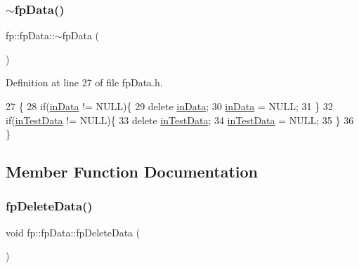 \subsubsection{\texorpdfstring{$\sim$fp\+Data()}{~fpData()}}
{\footnotesize\ttfamily fp\+::fp\+Data\+::$\sim$fp\+Data (\begin{DoxyParamCaption}{ }\end{DoxyParamCaption})\hspace{0.3cm}{\ttfamily [inline]}}



Definition at line 27 of file fp\+Data.\+h.


\begin{DoxyCode}
27                      \{
28 \textcolor{keywordflow}{if}(\hyperlink{classfp_1_1fpData_a49d7c3f58bcf88843c25b1b0c9714ebe}{inData} != NULL)\{
29                     \textcolor{keyword}{delete} \hyperlink{classfp_1_1fpData_a49d7c3f58bcf88843c25b1b0c9714ebe}{inData};
30                     \hyperlink{classfp_1_1fpData_a49d7c3f58bcf88843c25b1b0c9714ebe}{inData} = NULL;
31                 \}
32 \textcolor{keywordflow}{if}(\hyperlink{classfp_1_1fpData_ad4f4dd3a8d15633b7f983932fa60bbad}{inTestData} != NULL)\{
33                     \textcolor{keyword}{delete} \hyperlink{classfp_1_1fpData_ad4f4dd3a8d15633b7f983932fa60bbad}{inTestData};
34                     \hyperlink{classfp_1_1fpData_ad4f4dd3a8d15633b7f983932fa60bbad}{inTestData} = NULL;
35                 \}
36             \}
\end{DoxyCode}


\subsection{Member Function Documentation}
\mbox{\label{classfp_1_1fpData_a44df119acad6c339966d67f2c634a369}} 
\subsubsection{\texorpdfstring{fp\+Delete\+Data()}{fpDeleteData()}}
{\footnotesize\ttfamily void fp\+::fp\+Data\+::fp\+Delete\+Data (\begin{DoxyParamCaption}{ }\end{DoxyParamCaption})\hspace{0.3cm}{\ttfamily [inline]}}



